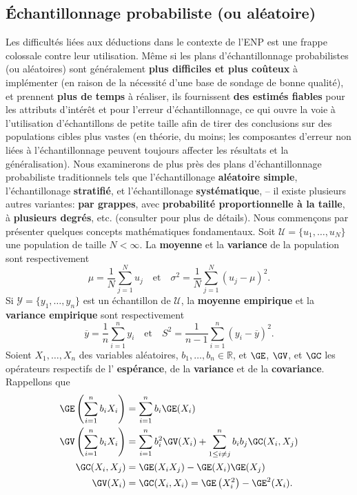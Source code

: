 \subsection{Échantillonnage probabiliste (ou al\'eatoire)}
Les difficult\'es li\'ees aux d\'eductions dans le contexte de l'ENP est une frappe colossale contre leur utilisation. M\^eme si les plans d'échantillonnage probabilistes (ou al\'eatoires) sont généralement \textbf{plus difficiles et plus coûteux} à impl\'ementer (en raison de la nécessité d'une base de sondage de bonne qualité), et prennent \textbf{plus de temps} à réaliser, ils fournissent \textbf{des estim\'es fiables} pour les attributs d'intérêt et pour l'erreur d'échantillonnage, ce qui ouvre la voie à l'utilisation d'échantillons de petite taille afin de tirer des conclusions sur des populations cibles plus vastes (en théorie, du moins; les composantes d'erreur non liées à l'échantillonnage peuvent toujours affecter les résultats et la généralisation). \newl Nous examinerons de plus près des plans d'échantillonnage probabiliste traditionnels tels que l'\'echantillonage \textbf{aléatoire simple}, l'\'echantillonage \textbf{stratifié}, et l'\'echantillonage \textbf{systématique}, -- il existe plusieurs autres variantes: \textbf{par grappes}, avec \textbf{probabilité proportionnelle à la taille},  \`a \textbf{plusieurs degr\'es}, etc.  (consulter \cite{DC_F,DC_SC} pour plus de détails).\newl
Nous commençons par présenter quelques concepts mathématiques fondamentaux. Soit $\mathcal{U}=\{u_1,\ldots,u_N\}$ une population de taille $N<\infty$.  La \textbf{moyenne} et la \textbf{variance} de la population sont respectivement  
$$\mu=\frac{1}{N}\sum_{j=1}^Nu_j\quad\mbox{et}\quad \sigma^2=\frac{1}{N}\sum_{j=1}^N(u_j-\mu)^2.$$ Si $\mathcal{Y}=\{y_1,\ldots,y_n\}$ est un \'echantillon de $\mathcal{U}$, la  \textbf{moyenne empirique} et la \textbf{variance empirique} sont respectivement  
$$\overline{y}=\frac{1}{n}\sum_{i=1}^ny_i\quad\mbox{et}\quad S^2=\frac{1}{n-1}\sum_{i=1}^n(y_i-\overline{y})^2.$$ Soient  $X_1,\ldots,X_n$ des variables al\'eatoires, $b_1,\ldots,b_n\in \mathbb{R}$, et $\GE$, $\GV$, et $\GC$ les op\'erateurs respectifs de l' \textbf{esp\'erance}, de la  \textbf{variance} et de la  \textbf{covariance}. Rappellons que  
\begin{align*}
    \GE \left(\sum_{i=1}^nb_iX_i\right) &=\sum_{i=1}^nb_i\GE(X_i) \\
    \GV\left(\sum_{i=1}^nb_iX_i\right)&=\sum_{i=1}^n b_i^2\GV(X_i)+\sum_{1\leq i\neq j}^nb_ib_j\GC(X_i,X_j) \\
\GC(X_i,X_j)&=\GE(X_iX_j)-\GE(X_i)\GE(X_j)\\
\GV(X_i)&=\GC(X_i,X_i)=\GE\left(X_i^2\right)-\GE^2(X_i).
\end{align*}
